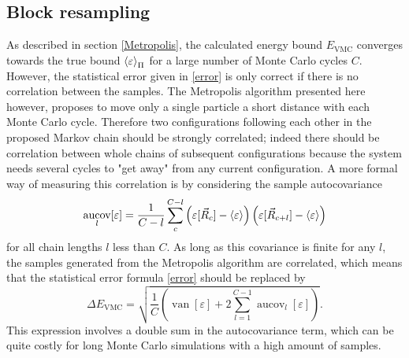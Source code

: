 \documentclass[a4paper,8pt]{article}
\DeclareMathOperator{\van}{van}
\DeclareMathOperator{\aucov}{aucov}
\begin{document}
\begin{multicols}{2}
\subsection{Block resampling}
As described in section \ref{Metropolis}, the calculated energy bound $E_\text{VMC}$ converges towards the true bound $\ev{\varepsilon}_\Pi$ for a large number of Monte Carlo cycles $C$. However, the statistical error given in \eqref{error} is only correct if there is no correlation between the samples. The Metropolis algorithm presented here however, proposes to move only a single particle a short distance with each Monte Carlo cycle. Therefore two configurations following each other in the proposed Markov chain should be strongly correlated; indeed there should be correlation between whole chains of subsequent configurations because the system needs several cycles to "get away" from any current configuration. A more formal way of measuring this correlation is by considering the sample autocovariance
\begin{equation}
\aucov_l[\varepsilon] = \frac{1}{C-l}\sum\limits_c^{C-l} \left(\varepsilon[\vec{R}_c]-\ev{\varepsilon}\right)\left(\varepsilon[\vec{R}_{c+l}]-\ev{\varepsilon}\right)
\end{equation}
for all chain lengths $l$ less than $C$. As long as this covariance is finite for any $l$, the samples generated from the Metropolis algorithm are correlated, which means that the statistical error formula \eqref{error} should be replaced by
\begin{equation}
\Delta E_\text{VMC} = \sqrt{\frac{1}{C} \left(\van[\varepsilon]+2\sum\limits_{l=1}^{C-1} \aucov_l[\varepsilon]\right)}. \label{error2}
\end{equation}
This expression involves a double sum in the autocovariance term, which can be quite costly for long Monte Carlo simulations with a high amount of samples.


\end{multicols}
\end{document}
